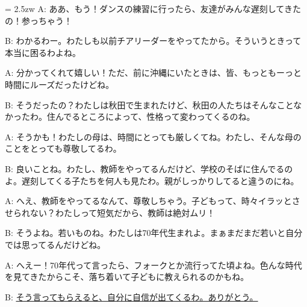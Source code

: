 \documentclass[11pt]{amsart}
\title{}
\author{}
\newenvironment{hangall}[1]{\hangindent = 2.5zw\everypar{\hangindent = 2.5zw}}{}
\begin{document}
\maketitle
\begin{hangall}{}%
A: ああ、もう！ダンスの練習に行ったら、友達がみんな遅刻してきたの！参っちゃう！

B: わかるわー。わたしも以前チアリーダーをやってたから。そういうときって本当に困るわよね。

A: 分かってくれて嬉しい！ただ、前に沖縄にいたときは、皆、もっともーっと時間にルーズだったけどね。

B: そうだったの？わたしは秋田で生まれたけど、秋田の人たちはそんなことなかったわ。住んでるところによって、性格って変わってくるのね。

A: そうかも！わたしの母は、時間にとっても厳しくてね。わたし、そんな母のことをとっても尊敬してるわ。

B: 良いことね。わたし、教師をやってるんだけど、学校のそばに住んでるのよ。遅刻してくる子たちを何人も見たわ。親がしっかりしてると違うのにね。

A: へえ、教師をやってるなんて、尊敬しちゃう。子どもって、時々イラッとさせられない？わたしって短気だから、教師は絶対ムリ！

B: そうよね。若いものね。わたしは70年代生まれよ。まぁまだまだ若いと自分では思ってるんだけどね。

A: へえー！70年代って言ったら、フォークとか流行ってた頃よね。色んな時代を見てきたからこそ、落ち着いて子どもに教えられるのかもね。

B: \ul{そう言ってもらえると、自分に自信が出てくるわ。ありがとう。}\end{hangall}
\end{document}

